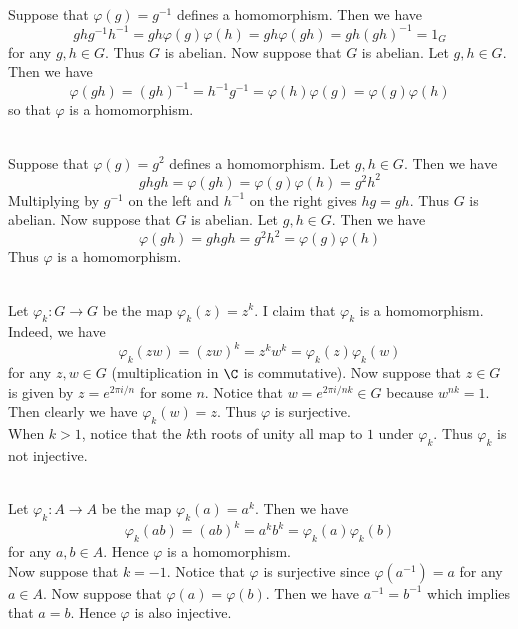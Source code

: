\documentclass[a4paper]{article}
\begin{document}
\begin{ex}{}{}\\
Suppose that $\varphi(g)=g^{-1}$ defines a homomorphism. Then we have $$ghg^{-1}h^{-1}=gh\varphi(g)\varphi(h)=gh\varphi(gh)=gh(gh)^{-1}=1_G$$ for any $g,h\in G$. Thus $G$ is abelian. Now suppose that $G$ is abelian. Let $g,h\in G$. Then we have $$\varphi(gh)=(gh)^{-1}=h^{-1}g^{-1}=\varphi(h)\varphi(g)=\varphi(g)\varphi(h)$$ so that $\varphi$ is a homomorphism. 
\end{ex}

\begin{ex}{}{}\\
Suppose that $\varphi(g)=g^2$ defines a homomorphism. Let $g,h\in G$. Then we have $$ghgh=\varphi(gh)=\varphi(g)\varphi(h)=g^2h^2$$ Multiplying by $g^{-1}$ on the left and $h^{-1}$ on the right gives $hg=gh$. Thus $G$ is abelian. Now suppose that $G$ is abelian. Let $g,h\in G$. Then we have $$\varphi(gh)=ghgh=g^2h^2=\varphi(g)\varphi(h)$$ Thus $\varphi$ is a homomorphism. 
\end{ex}

\begin{ex}{}{}\\
Let $\varphi_k:G\to G$ be the map $\varphi_k(z)=z^k$. I claim that $\varphi_k$ is a homomorphism. Indeed, we have $$\varphi_k(zw)=(zw)^k=z^kw^k=\varphi_k(z)\varphi_k(w)$$ for any $z,w\in G$ (multiplication in $\C$ is commutative). Now suppose that $z\in G$ is given by $z=e^{2\pi i/n}$ for some $n$. Notice that $w=e^{2\pi i/nk}\in G$ because $w^{nk}=1$. Then clearly we have $\varphi_k(w)=z$. Thus $\varphi$ is surjective. \\

When $k>1$, notice that the $k$th roots of unity all map to $1$ under $\varphi_k$. Thus $\varphi_k$ is not injective. 
\end{ex}

\begin{ex}{}{}
\end{ex}

\begin{ex}{}{}
\end{ex}

\begin{ex}{}{}\\
Let $\varphi_k:A\to A$ be the map $\varphi_k(a)=a^k$. Then we have $$\varphi_k(ab)=(ab)^k=a^kb^k=\varphi_k(a)\varphi_k(b)$$ for any $a,b\in A$. Hence $\varphi$ is a homomorphism. \\

Now suppose that $k=-1$. Notice that $\varphi$ is surjective since $\varphi(a^{-1})=a$ for any $a\in A$. Now suppose that $\varphi(a)=\varphi(b)$. Then we have $a^{-1}=b^{-1}$ which implies that $a=b$. Hence $\varphi$ is also injective. 
\end{ex}
\end{document}
